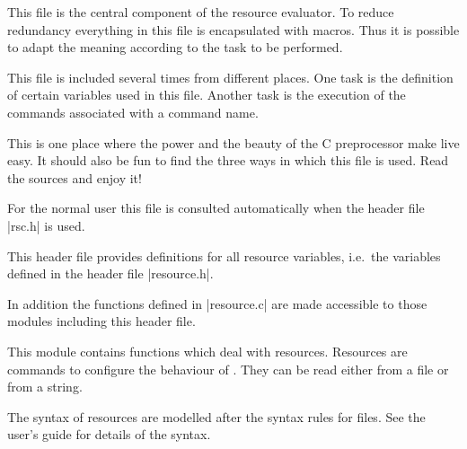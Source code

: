 
This file is the central component of the resource evaluator.
To reduce redundancy everything in this file is encapsulated
with macros. Thus it is possible to adapt the meaning
according to the task to be performed.

This file is included several times from different places. One
task is the definition of certain variables used in this
file. Another task is the execution of the commands associated
with a command name.

This is one place where the power and the beauty of the C
preprocessor make live easy. It should also be fun to find the
three ways in which this file is used. Read the sources and
enjoy it! 

For the normal user this file is consulted automatically when
the header file |rsc.h| is used.



This header file provides definitions for all resource
variables, i.e.\ the variables defined in the header file
|resource.h|. 

In addition the functions defined in |resource.c| are made
accessible to those modules including this header file.


This module contains functions which deal with resources.
Resources are commands to configure the behaviour of
\BibTool. They can be read either from a file or from a
string. 

The syntax of resources are modelled after the syntax rules
for \BibTeX{} files. See the user's guide for details of the syntax.

